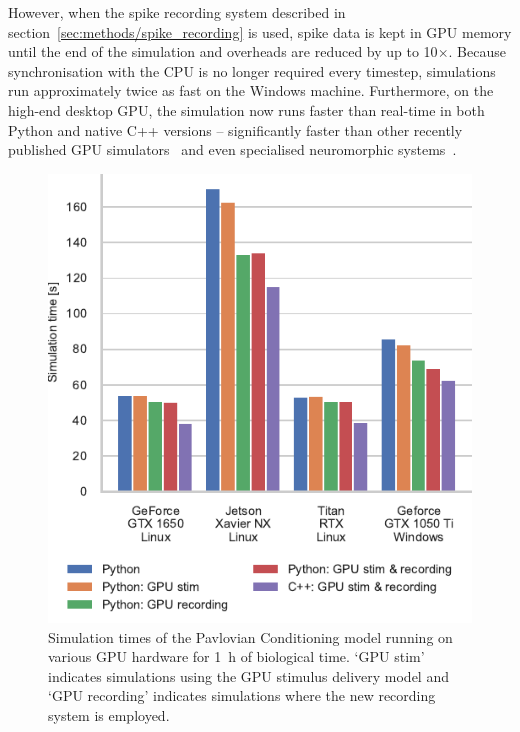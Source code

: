 \documentclass[utf8]{frontiersSCNS} %
\begin{document}
However, when the spike recording system described in section~\ref{sec:methods/spike_recording} is used, spike data is kept in GPU memory until the end of the simulation and overheads are reduced by up to 10$\times$.
Because synchronisation with the CPU is no longer required every timestep, simulations run approximately twice as fast on the Windows machine.
Furthermore, on the high-end desktop GPU, the simulation now runs faster than real-time in both Python and native C++ versions -- significantly faster than other recently published GPU simulators~\citep{Golosio2021} and even specialised neuromorphic systems~\citep{Rhodes2019}.
%
\begin{figure}[t!]
    \begin{center}
        \includegraphics{figures/izhikevich.pdf}
    \end{center}
    \caption{Simulation times of the Pavlovian Conditioning model running on various GPU hardware for \SI{1}{\hour} of biological time.
    `GPU stim' indicates simulations using the GPU stimulus delivery model and `GPU recording' indicates simulations where the new recording system is employed.}
    \label{fig:izhikevich}
\end{figure}
%
\end{document}

